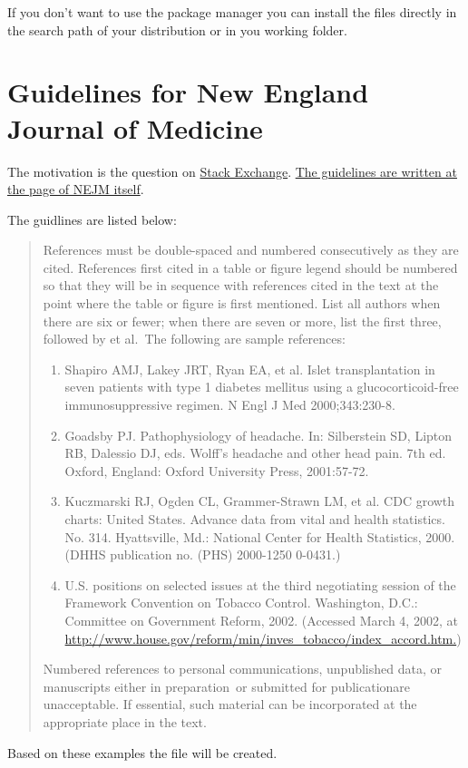 \documentclass[english]{ltxdockit}[2011/03/25]
\begin{document}
If you don't want to use the package manager you can install the files directly in the search path of your distribution or in you working folder.

\section[Guidelines for NEJM]{Guidelines for  New England Journal of Medicine}
\label{guidlines}
The motivation is the question on \href{http://tex.stackexchange.com/questions/26891/biblatex-style-file-for-new-england-journal-of-medicine-nejm/26894#26894}{Stack Exchange}. \href{http://www.nejm.org/page/author-center/manuscript-submission}{The guidelines are written at the page of NEJM itself}.

The guidlines are listed below:
\begin{quote}
References must be double-spaced and numbered consecutively as they are cited. References first cited in a table or figure legend should be numbered so that they will be in sequence with references cited in the text at the point where the table or figure is first mentioned. List all authors when there are six or fewer; when there are seven or more, list the first three, followed by \glqq et al.\grqq\ The following are sample references:
\begin{enumerate}
 \item    Shapiro AMJ, Lakey JRT, Ryan EA, et al. Islet transplantation in seven patients with type 1
          diabetes mellitus using a glucocorticoid-free immunosuppressive regimen. N Engl J Med 
          2000;343:230-8.
 \item    Goadsby PJ. Pathophysiology of headache. In: Silberstein SD, Lipton RB, Dalessio DJ, eds.
          Wolff's headache and other head pain. 7th ed. Oxford, England: Oxford University Press,
          2001:57-72.
 \item    Kuczmarski RJ, Ogden CL, Grammer-Strawn LM, et al. CDC growth charts: United States. Advance
          data from vital and health statistics. No. 314. Hyattsville, Md.: National Center for Health
          Statistics, 2000. (DHHS publication no. (PHS) 2000-1250 0-0431.)
 \item    U.S. positions on selected issues at the third negotiating session of the Framework Convention
          on Tobacco Control. Washington, D.C.: Committee on Government Reform, 2002. (Accessed March
          4, 2002, at \url{http://www.house.gov/reform/min/inves_tobacco/index_accord.htm.})
\end{enumerate}
Numbered references to personal communications, unpublished data, or manuscripts either \glqq in preparation\grqq\ or \glqq submitted for publication\grqq are unacceptable. If essential, such material can be incorporated at the appropriate place in the text.
\end{quote}
Based on these examples the  file will be created.
\end{document}
